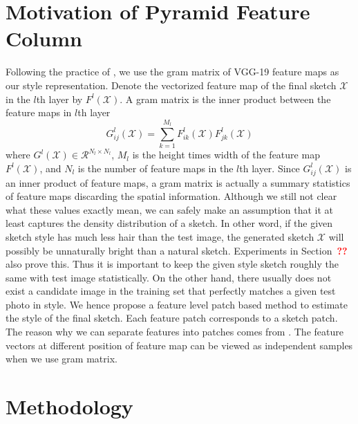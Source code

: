 \documentclass[10pt,twocolumn,letterpaper]{article}
\def\red[#1]{\textcolor{red}{\textbf{#1}}}
\begin{document}
\section{Motivation of Pyramid Feature Column}

Following the practice of \cite{gatys2015neural}, we use the gram matrix of VGG-19\cite{simonyan2014very} feature maps as our style representation. Denote the vectorized feature map of the final sketch $\mathcal{X}$ in the $l$th layer by $F^{l}(\mathcal{X})$. A gram matrix is the inner product between the feature maps in $l$th layer
\begin{equation}
G^l_{ij}(\mathcal{X}) = \sum \limits_{k=1}^{M_l} F^l_{ik}(\mathcal{X}) F^l_{jk}(\mathcal{X})
\label{eq:Gram_element}
\end{equation}
where $G^l(\mathcal{X}) \in {\mathcal{R}^{N_l \times N_l}}$, $M_l$ is the height times width of the feature map $F^{l}(\mathcal{X})$, and $N_l$ is the number of feature maps in the $l$th layer. Since $G^l_{ij}(\mathcal{X})$ is an inner product of feature maps, a gram matrix is actually a summary statistics of feature maps discarding the spatial information. Although we still not clear what these values exactly mean, we can safely make an assumption that it at least captures the density distribution of a sketch. In other word, if the given sketch style has much less hair than the test image, the generated sketch $\mathcal{X}$ will possibly be unnaturally bright than a natural sketch. Experiments in Section~\red[??] also prove this. 
Thus it is important to keep the given style sketch roughly the same with test image statistically. On the other hand, there usually does not exist a candidate image in the training set that perfectly matches a given test photo in style. We hence propose a feature level patch based method to estimate the style of the final sketch. Each feature patch corresponds to a sketch patch. The reason why we can separate features into patches comes from \cite{Li2017Demistify}. The feature vectors at different position of feature map can be viewed as independent samples when we use gram matrix. 

\section{Methodology}
\end{document}
